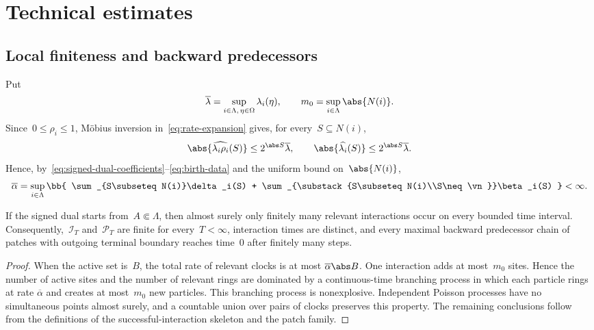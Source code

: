 \section{Technical estimates}
\label{app:technical-background}

\subsection{Local finiteness and backward predecessors}
\label{app:local-finiteness}

Put
\begin{equation*}
\overline\lambda
=
\sup_{i\in\Lambda,\,\eta\in\Omega}\lambda_i(\eta),
\qquad
m_0=\sup_{i\in\Lambda}\abs{N(i)}.
\end{equation*}
Since~$0\leq\rho_i\leq1$, M\"obius inversion in~\eqref{eq:rate-expansion}
gives, for every~$S\subseteq N(i)$,
\begin{equation*}
\abs{\widehat{\lambda_i\rho_i}(S)}
\leq
2^{\abs S}\overline\lambda,
\qquad
\abs{\widehat{\lambda_i}(S)}
\leq
2^{\abs S}\overline\lambda.
\end{equation*}
Hence, by~\eqref{eq:signed-dual-coefficients}--\eqref{eq:birth-data} and the
uniform bound on~$\abs{N(i)}$,
\begin{equation*}
\overline\alpha
=
\sup_{i\in\Lambda}
\bb{
 \sum_{S\subseteq N(i)}\delta_i(S)
 +
 \sum_{\substack{S\subseteq N(i)\\S\neq\vn}}\beta_i(S)
}
<\infty.
\end{equation*}

\begin{lemma}
\label{lem:dual-local-finiteness}
If the signed dual starts from~$A\Subset\Lambda$, then almost surely only
finitely many relevant interactions occur on every bounded time interval.
Consequently,~$\mathcal I_T$ and~$\mathcal P_T$ are finite for every~$T<\infty$,
interaction times are distinct, and every maximal backward predecessor chain
of patches with outgoing terminal boundary reaches time~$0$ after finitely many
steps.
\end{lemma}

\begin{proof}
When the active set is~$B$, the total rate of relevant clocks is at most
$\overline\alpha\abs B$. One interaction adds at most~$m_0$ sites. Hence the
number of active sites and the number of relevant rings are dominated by a
continuous-time branching process in which each particle rings at rate
$\overline\alpha$ and creates at most~$m_0$ new particles. This branching
process is nonexplosive. Independent Poisson processes have no simultaneous
points almost surely, and a countable union over pairs of clocks preserves this
property. The remaining conclusions follow from the definitions of the
successful-interaction skeleton and the patch family.
\end{proof}

